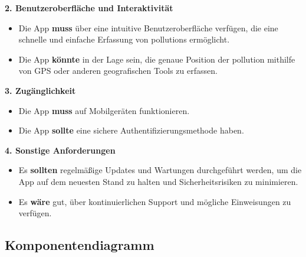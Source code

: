 \documentclass[a4paper,12pt]{article}
\begin{document}
\noindent\textbf{2. Benutzeroberfläche und Interaktivität}

\begin{itemize}
    \item Die App \textbf{muss} über eine intuitive Benutzeroberfläche verfügen, die eine schnelle und einfache Erfassung von \glspl{pollution} ermöglicht.
    \item Die App \textbf{könnte} in der Lage sein, die genaue Position der \gls{pollution} mithilfe von GPS oder anderen geografischen Tools zu erfassen.
\end{itemize}

\noindent\textbf{3. Zugänglichkeit}

\begin{itemize}
    \item Die App \textbf{muss} auf Mobilgeräten funktionieren.
    \item Die App \textbf{sollte} eine sichere Authentifizierungsmethode haben.
\end{itemize}

\noindent\textbf{4. Sonstige Anforderungen}

\begin{itemize}
    \item Es \textbf{sollten} regelmäßige Updates und Wartungen durchgeführt werden, um die App auf dem neuesten Stand zu halten und Sicherheitsrisiken zu minimieren.
    \item Es \textbf{wäre} gut, über kontinuierlichen Support und mögliche Einweisungen zu verfügen.
\end{itemize}

\clearpage
\subsection{Komponentendiagramm}
\label{sec:komponentendiagramm}
\end{document}

